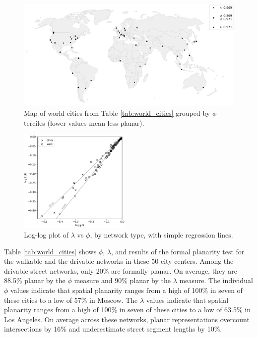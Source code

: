 \documentclass[Afour,sageh,times]{sagej}
\begin{document}
\begin{figure}[htbp]
	\center
	\includegraphics[width=\textwidth]{world_map_phi_bw.png}
	\caption{Map of world cities from Table \ref{tab:world_cities} grouped by $\phi$ terciles (lower values mean less planar).}
	\label{fig:world_map_bw}
\end{figure}

\begin{figure}[htbp]
	\includegraphics[width=0.48\textwidth]{regression_phi_split.png}
	\caption{Log-log plot of $\lambda$ vs $\phi$, by network type, with simple regression lines.}
	\label{fig:regression_split}
\end{figure}

Table \ref{tab:world_cities} shows $\phi$, $\lambda$, and results of the formal planarity test for the walkable and the drivable networks in these 50 city centers. Among the drivable street networks, only 20\% are formally planar. On average, they are 88.5\% planar by the $\phi$ measure and 90\% planar by the $\lambda$ measure. The individual $\phi$ values indicate that spatial planarity ranges from a high of 100\% in seven of these cities to a low of 57\% in Moscow. The $\lambda$ values indicate that spatial planarity ranges from a high of 100\% in seven of these cities to a low of 63.5\% in Los Angeles. On average across these networks, planar representations overcount intersections by 16\% and underestimate street segment lengths by 10\%.
\end{document}
